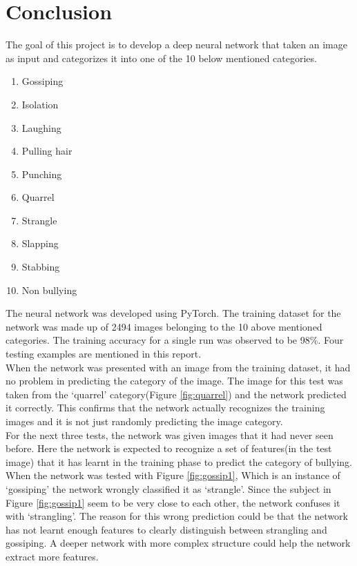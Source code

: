 \documentclass[12pt]{article}
\begin{document}
\section{Conclusion}
The goal of this project is to develop a deep neural network that taken an image as input and categorizes it into one of the 10 below mentioned categories.
\begin{enumerate}
	\item Gossiping
	\item Isolation
	\item Laughing
	\item Pulling hair
	\item Punching
	\item Quarrel
	\item Strangle
	\item Slapping
	\item Stabbing
	\item Non bullying
\end{enumerate}
The neural network was developed using PyTorch. The training dataset for the network was made up of 2494 images belonging to the 10 above mentioned categories. The training accuracy for a single run was observed to be 98\%. Four testing examples are mentioned in this report. \\

When the network was presented with an image from the training dataset, it had no problem in predicting the category of the image. The image for this test was taken from the \lq{quarrel}\rq{} category(Figure \ref{fig:quarrel}) and the network predicted it correctly. This confirms that the network actually recognizes the training images and it is not just randomly predicting the image category. \\

For the next three tests, the network was given images that it had never seen before. Here the network is expected to recognize a set of features(in the test image) that it has learnt in the training phase to predict the category of bullying. \\

When the network was tested with Figure \ref{fig:gossip1}, Which is an instance of \lq{gossiping}\rq{} the network wrongly classified it as \lq{strangle}\rq{}. Since the subject in Figure \ref{fig:gossip1} seem to be very close to each other, the network confuses it with \lq{strangling}\rq{}. The reason for this wrong prediction could be that the network has not learnt enough features to clearly distinguish between strangling and gossiping. A deeper network with more complex structure could help the network extract more features. \\
\end{document}
